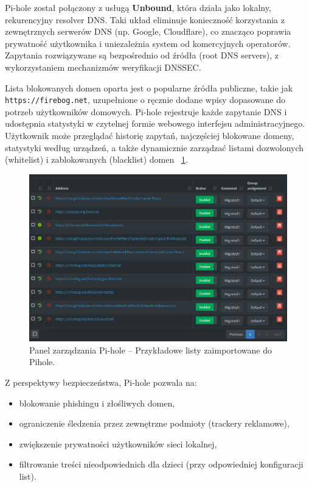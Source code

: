 \documentclass[
    left=2.5cm,         %
    right=2.5cm,        %
    top=2.5cm,          %
    bottom=3cm,         %
    bindingoffset=6mm,  %
    nohyphenation=true %
]{eiti/eiti-thesis} %
\begin{document}
Pi-hole został połączony z usługą \textbf{Unbound}, która działa jako lokalny, rekurencyjny resolver DNS. Taki układ eliminuje konieczność korzystania z zewnętrznych serwerów DNS\cite{dns-wikipedia} (np. Google, Cloudflare), co znacząco poprawia prywatność użytkownika i uniezależnia system od komercyjnych operatorów. Zapytania rozwiązywane są bezpośrednio od źródła (root DNS servers), z wykorzystaniem mechanizmów weryfikacji DNSSEC.

Lista blokowanych domen oparta jest o popularne źródła publiczne, takie jak \texttt{https://firebog.net}, uzupełnione o ręcznie dodane wpisy dopasowane do potrzeb użytkowników domowych. Pi-hole rejestruje każde zapytanie DNS i udostępnia statystyki w czytelnej formie webowego interfejsu administracyjnego. Użytkownik może przeglądać historię zapytań, najczęściej blokowane domeny, statystyki według urządzeń, a także dynamicznie zarządzać listami dozwolonych (whitelist) i zablokowanych (blacklist) domen ~\ref{fig:pihole-listy}.
\begin{figure}[H]
    \centering
    \includegraphics[width=\textwidth]{img/pihole_listy.png}
    \caption{Panel zarządzania Pi-hole – Przykładowe listy zaimportowane do Pihole.}
    \label{fig:pihole-listy}
\end{figure}

Z perspektywy bezpieczeństwa, Pi-hole pozwala na:
\begin{itemize}
    \item blokowanie phishingu i złośliwych domen,
    \item ograniczenie śledzenia przez zewnętrzne podmioty (trackery reklamowe),
    \item zwiększenie prywatności użytkowników sieci lokalnej,
    \item filtrowanie treści nieodpowiednich dla dzieci (przy odpowiedniej konfiguracji list).
\end{itemize}
\end{document}
